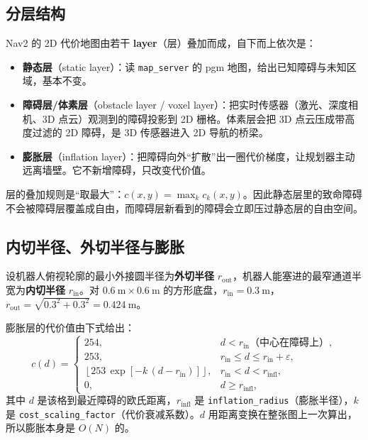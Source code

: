 \subsection{分层结构}

Nav2 的 2D 代价地图由若干 \textbf{layer}（层）叠加而成，自下而上依次是：

\begin{itemize}
  \item \textbf{静态层}（static layer）：读 \texttt{map\_server} 的 pgm 地图，给出已知障碍与未知区域，基本不变。
  \item \textbf{障碍层/体素层}（obstacle layer / voxel layer）：把实时传感器（激光、深度相机、3D 点云）观测到的障碍投影到 2D 栅格。体素层会把 3D 点云压成带高度过滤的 2D 障碍，是 3D 传感器进入 2D 导航的桥梁。
  \item \textbf{膨胀层}（inflation layer）：把障碍向外“扩散”出一圈代价梯度，让规划器主动远离墙壁。它不新增障碍，只改变代价值。
\end{itemize}

层的叠加规则是“取最大”：$c(x,y)=\max_k c_k(x,y)$。因此静态层里的致命障碍不会被障碍层覆盖成自由，而障碍层新看到的障碍会立即压过静态层的自由空间。

\subsection{内切半径、外切半径与膨胀}

设机器人俯视轮廓的最小外接圆半径为\textbf{外切半径} $r_{\mathrm{out}}$，机器人能塞进的最窄通道半宽为\textbf{内切半径} $r_{\mathrm{in}}$。对 $0.6\ \mathrm{m}\times 0.6\ \mathrm{m}$ 的方形底盘，$r_{\mathrm{in}}=0.3\ \mathrm{m}$，$r_{\mathrm{out}}=\sqrt{0.3^2+0.3^2}=0.424\ \mathrm{m}$。

膨胀层的代价值由下式给出：
\begin{equation}
  c(d)=
  \begin{cases}
    254, & d<r_{\mathrm{in}} \text{（中心在障碍上）},\\[2pt]
    253, & r_{\mathrm{in}}\le d \le r_{\mathrm{in}}+\varepsilon,\\[2pt]
    \left\lfloor 253\,\exp\!\left[-k\,(d-r_{\mathrm{in}})\right]\right\rfloor, & r_{\mathrm{in}}<d<r_{\mathrm{infl}},\\[2pt]
    0, & d\ge r_{\mathrm{infl}},
  \end{cases}
  \label{eq:18-inflation}
\end{equation}
其中 $d$ 是该格到最近障碍的欧氏距离，$r_{\mathrm{infl}}$ 是 \texttt{inflation\_radius}（膨胀半径），$k$ 是 \texttt{cost\_scaling\_factor}（代价衰减系数）。$d$ 用距离变换在整张图上一次算出，所以膨胀本身是 $O(N)$ 的。

